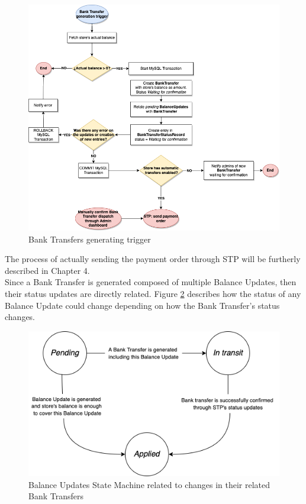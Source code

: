 \begin{figure} [H]
    \centering
    \includegraphics[scale = 0.4]{assets/flowcharts/BankTransferTrigger.png}
    \caption{Bank Transfers generating trigger}\label{fig:bank_Transfer_trigger}
\end{figure}

The process of actually sending the payment order through STP will be furtherly described in Chapter 4.\\

Since a Bank Transfer is generated composed of multiple Balance Updates, then their status updates are directly related. Figure \ref{fig:bu_state_machine} describes how the status of any Balance Update could change depending on how the Bank Transfer's status changes.

\begin{figure} [H]
    \centering
    \includegraphics[scale = 0.6]{assets/diagrams/BUStateMachine.png}
    \caption{Balance Updates State Machine related to changes in their related Bank Transfers}\label{fig:bu_state_machine}
\end{figure}

